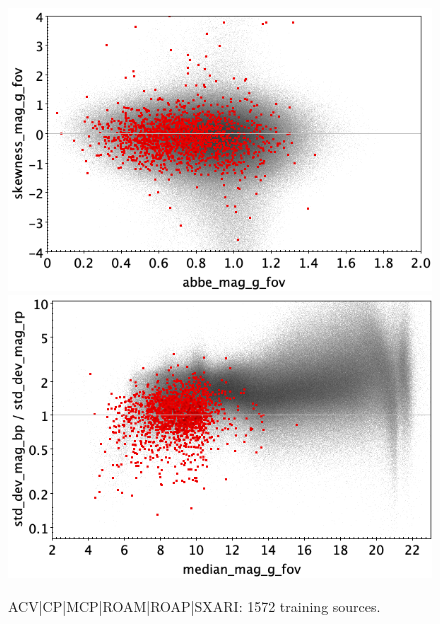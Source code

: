 \documentclass[longauth]{aa}
\begin{document}
\begin{appendix}
\begin{figure}
\vspace{4mm}
 \includegraphics[width=0.45\hsize]{figures/appendix/ACV_trn_ask.png}  %
\hspace{2mm}
 \includegraphics[width=0.45\hsize]{figures/appendix/ACV_trn_msdr.png}  \\ %
\vspace{4mm}
 \caption{ACV|CP|MCP|ROAM|ROAP|SXARI: 1572 training sources.}  
 \label{fig:app:ACV_trn}
\end{figure}


\end{appendix}
\end{document}
